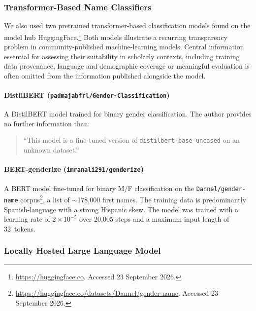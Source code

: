 \documentclass{eceasst}
\begin{document}
\subsubsection{Transformer-Based Name Classifiers}
We also used two pretrained transformer-based classification models found on the model hub HuggingFace.\footnote{\url{https://huggingface.co}. Accessed 23 September 2026.} Both models illustrate a recurring transparency problem in community-published machine-learning models. Central information essential for assessing their suitability in scholarly contexts, including training data provenance, language and demographic coverage or meaningful evaluation is often omitted from the information published alongside the model.

\paragraph{DistilBERT (\texttt{padmajabfrl/Gender-Classification})}
A DistilBERT model trained for binary gender classification. The author provides no further information than:
\begin{quote}``This model is a fine-tuned version of \texttt{distilbert-base-uncased} on an unknown dataset.''~\cite{padmajabfrl_gender-classification_2025}\end{quote}
\paragraph{BERT-genderize (\texttt{imranali291/genderize})} A BERT model fine-tuned for binary M/F classification on the \texttt{Dannel/gender-name} corpus\footnote{\url{https://huggingface.co/datasets/Dannel/gender-name}. Accessed 23 September 2026.}, a list of $\sim$178{,}000 first names. The training data is predominantly Spanish-language with a strong Hispanic skew. The model was trained with a learning rate of $2 \times 10^{-5}$ over 20{,}005 steps and a maximum input length of 32~tokens.~\cite{ali_genderize_2025}

\subsubsection{Locally Hosted Large Language Model}
\end{document}

